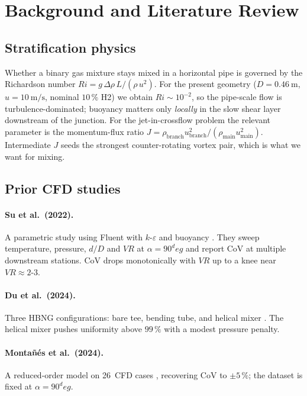 \documentclass[10pt,a4paper]{article}
\def\Hi{H2}%
\def\dD{d/D}%
\def\VR{VR}%
\def\CoV{CoV}%
\def\Ri{Ri}%
\def\circ{ deg}%
\newcommand{\Hi}{\ensuremath{\mathrm{H_2}}}
\newcommand{\dD}{\ensuremath{d/D}}
\newcommand{\VR}{\ensuremath{\mathrm{VR}}}
\newcommand{\CoV}{\ensuremath{\mathrm{CoV}}}
\newcommand{\Ri}{\ensuremath{\mathrm{Ri}}}
\begin{document}
\section{Background and Literature Review}
\label{sec:lit}

\subsection{Stratification physics}
Whether a binary gas mixture stays mixed in a horizontal pipe is
governed by the Richardson number
\(\Ri = g\,\Delta\rho\,L / (\rho\,u^2)\).
For the present geometry (\(D=\SI{0.46}{\meter}\),
\(u=\SI{10}{\meter\per\second}\), nominal \(10\,\%\) \Hi{})
we obtain \(\Ri\sim 10^{-2}\), so the pipe-scale flow is
turbulence-dominated; buoyancy matters only \emph{locally} in
the slow shear layer downstream of the junction.
For the jet-in-crossflow problem the relevant parameter is the
momentum-flux ratio
\(J = \rho_{\mathrm{branch}}u_{\mathrm{branch}}^{2}
/ (\rho_{\mathrm{main}}u_{\mathrm{main}}^{2})\).
Intermediate \(J\) seeds the strongest counter-rotating vortex
pair, which is what we want for mixing.

\subsection{Prior CFD studies}

\paragraph{Su et al.\ (2022).}
A parametric study using Fluent with \(k\)-\(\varepsilon\) and
buoyancy \citep{su2022prediction}.  They sweep temperature,
pressure, \(\dD\) and \(\VR\) at \(\alpha=90^\circ\) and report
\CoV{} at multiple downstream stations.  \CoV{} drops
monotonically with \(\VR\) up to a knee near \(\VR\approx 2\)-\(3\).

\paragraph{Du et al.\ (2024).}
Three HBNG configurations: bare tee, bending tube, and helical
mixer \citep{du2024numerical}.  The helical mixer pushes
uniformity above \(99\,\%\) with a modest pressure penalty.

\paragraph{Monta\~n\'es et al.\ (2024).}
A reduced-order model on 26~CFD cases
\citep{montanes2024comprehensive}, recovering \CoV{} to
\(\pm 5\,\%\); the dataset is fixed at \(\alpha=90^\circ\).
\end{document}
